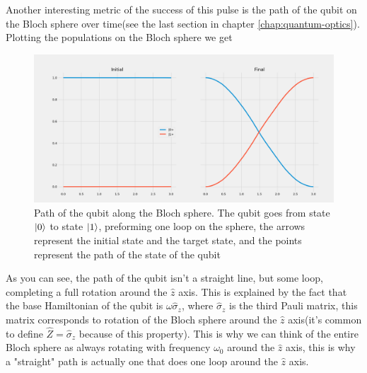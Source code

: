 \documentclass[english, a4paper, 12pt, twoside]{article}
\numberwithin{equation}{section} %
\begin{document}
Another interesting metric of the success of this pulse is the path of the qubit on the Bloch sphere over time(see the last section in chapter \ref{chap:quantum-optics}). Plotting the populations on the Bloch sphere we get 
\begin{figure}[H]
    \centering %
    \includegraphics[width=1\columnwidth]{Results/qubit-band-amp-const/level-population.png}
    \caption{Path of the qubit along the Bloch sphere. The qubit goes from state $\ket{0}$ to state $\ket{1}$, preforming one loop on the sphere, the arrows represent the initial state and the target state, and the points represent the path of the state of the qubit}
    \label{fig:band-amp-const-blcoh}
\end{figure}
As you can see, the path of the qubit isn't a straight line, but some loop, completing a full rotation around the $\hat{z}$ axis. This is explained by the fact that the base Hamiltonian of the qubit is $\omega \hat{\sigma}_z$, where $\hat{\sigma}_z$ is the third Pauli matrix, this matrix corresponds to rotation of the Bloch sphere around the $\hat{z}$ axis(it's common to define $\hat{Z} = \hat{\sigma}_z$ because of this property). This is why we can think of the entire Bloch sphere as always rotating with frequency $\omega_0$ around the $\hat{z}$ axis, this is why a "straight" path is actually one that does one loop around the $\hat{z}$ axis.
\end{document}
